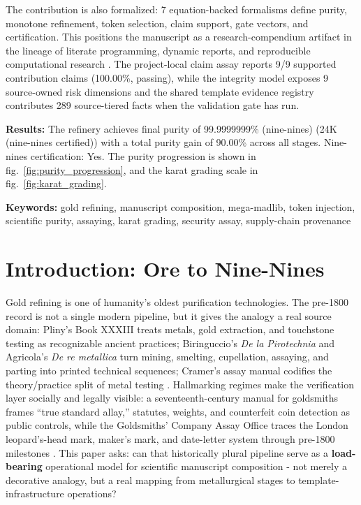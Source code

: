 \documentclass[
]{article}
\begin{document}
The contribution is also formalized: 7 equation-backed formalisms define
purity, monotone refinement, token selection, claim support, gate
vectors, and certification. This positions the manuscript as a
research-compendium artifact in the lineage of literate programming,
dynamic reports, and reproducible computational research
\citep{knuth1984literate, leisch2002sweave, peng2011reproducible, sandve2013ten}.
The project-local claim assay reports 9/9 supported contribution claims
(100.00\%, passing), while the integrity model exposes 9 source-owned
risk dimensions and the shared template evidence registry contributes
289 source-tiered facts when the validation gate has run.

\textbf{Results:} The refinery achieves final purity of 99.9999999\%
(nine-nines) (24K (nine-nines certified)) with a total purity gain of
90.00\% across all stages. Nine-nines certification: Yes. The purity
progression is shown in fig.~\ref{fig:purity_progression}, and the karat
grading scale in fig.~\ref{fig:karat_grading}.

\textbf{Keywords:} gold refining, manuscript composition, mega-madlib,
token injection, scientific purity, assaying, karat grading, security
assay, supply-chain provenance

\newpage

\section{Introduction: Ore to Nine-Nines}\label{sec:introduction}

Gold refining is one of humanity's oldest purification technologies. The
pre-1800 record is not a single modern pipeline, but it gives the
analogy a real source domain: Pliny's Book XXXIII treats metals, gold
extraction, and touchstone testing as recognizable ancient practices;
Biringuccio's \emph{De la Pirotechnia} and Agricola's \emph{De re
metallica} turn mining, smelting, cupellation, assaying, and parting
into printed technical sequences; Cramer's assay manual codifies the
theory/practice split of metal testing
\citep{pliny_natural_history_33, biringuccio_pirotechnia_1540, agricola_de_re_metallica_1556, cramer_assaying_metals_1741}.
Hallmarking regimes make the verification layer socially and legally
visible: a seventeenth-century manual for goldsmiths frames ``true
standard allay,'' statutes, weights, and counterfeit coin detection as
public controls, while the Goldsmiths' Company Assay Office traces the
London leopard's-head mark, maker's mark, and date-letter system through
pre-1800 milestones
\citep{badcock_touchstone_1678, goldsmiths_hallmarking_history}. This
paper asks: can that historically plural pipeline serve as a
\textbf{load-bearing} operational model for scientific manuscript
composition - not merely a decorative analogy, but a real mapping from
metallurgical stages to template-infrastructure operations?
\end{document}
